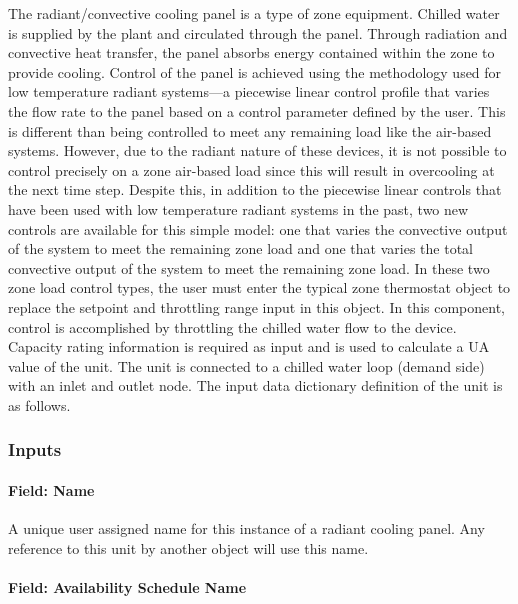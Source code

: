The radiant/convective cooling panel is a type of zone equipment.  Chilled water is supplied by the plant and circulated through the panel.  Through radiation and convective heat transfer, the panel absorbs energy contained within the zone to provide cooling.  Control of the panel is achieved using the methodology used for low temperature radiant systems—a piecewise linear control profile that varies the flow rate to the panel based on a control parameter defined by the user.  This is different than being controlled to meet any remaining load like the air-based systems.  However, due to the radiant nature of these devices, it is not possible to control precisely on a zone air-based load since this will result in overcooling at the next time step.  Despite this, in addition to the piecewise linear controls that have been used with low temperature radiant systems in the past, two new controls are available for this simple model: one that varies the convective output of the system to meet the remaining zone load and one that varies the total convective output of the system to meet the remaining zone load.  In these two zone load control types, the user must enter the typical zone thermostat object to replace the setpoint and throttling range input in this object.  In this component, control is accomplished by throttling the chilled water flow to the device.  Capacity rating information is required as input and is used to calculate a UA value of the unit. The unit is connected to a chilled water loop (demand side) with an inlet and outlet node. The input data dictionary definition of the unit is as follows.

\subsubsection{Inputs}\label{inputs-3-028-1}

\paragraph{Field: Name}\label{field-name-3-025-1}

A unique user assigned name for this instance of a radiant cooling panel. Any reference to this unit by another object will use this name.

\paragraph{Field: Availability Schedule Name}\label{field-availability-schedule-name-3-005-1}

